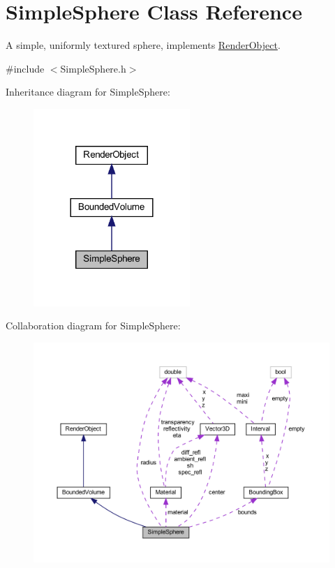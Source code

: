 \hypertarget{classSimpleSphere}{}\section{Simple\+Sphere Class Reference}
\label{classSimpleSphere}


A simple, uniformly textured sphere, implements \mbox{\hyperlink{classRenderObject}{Render\+Object}}.  




{\ttfamily \#include $<$Simple\+Sphere.\+h$>$}



Inheritance diagram for Simple\+Sphere\+:
\nopagebreak
\begin{figure}[H]
\begin{center}
\leavevmode
\includegraphics[width=168pt]{classSimpleSphere__inherit__graph}
\end{center}
\end{figure}


Collaboration diagram for Simple\+Sphere\+:
\nopagebreak
\begin{figure}[H]
\begin{center}
\leavevmode
\includegraphics[width=350pt]{classSimpleSphere__coll__graph}
\end{center}
\end{figure}
